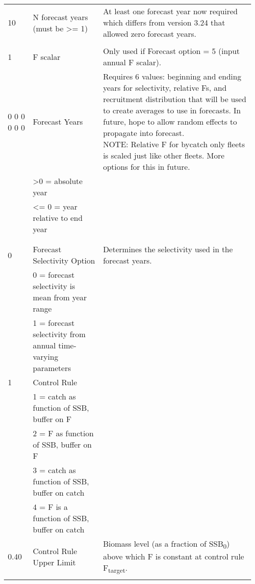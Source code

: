\begin{landscape}
{\begin{longtable}{p{3.2cm} p{7cm} p{10.8cm}}
  \hline
  10 & N forecast years (must be >= 1) &  \multirow{1}{1cm}[-0.25cm]{\parbox{11cm }{ At least one forecast year now required which differs from version 3.24 that allowed zero forecast years.}} \Tstrut\\
     & & \Bstrut\\
     
  \hline
  1 & F scalar & \multirow{1}{1cm}[-0.10cm]{\parbox{11cm}{Only used if Forecast option = 5 (input annual F scalar).}}\Tstrut\Bstrut\\
  
  \hline
  0 0 0 0 0 0 & Forecast Years &  \multirow{1}{1cm}[-0.25cm]{\parbox{11cm}{Requires 6 values:  beginning and ending years for selectivity, relative Fs, and recruitment distribution that will be used to create averages to use in forecasts.  In future, hope to allow random effects to propagate into forecast.  \\NOTE:  Relative F for bycatch only fleets is scaled just like other fleets.  More options for this in future.}}\Tstrut\\
    & >0 = absolute year & \\
    & <= 0 = year relative to end year & \\
    & & \\ 
    & & \Bstrut\\  

 \pagebreak   
 0 & Forecast Selectivity Option & Determines the selectivity used in the forecast years. \Tstrut\\
   & 0 = forecast selectivity is mean from year range & \\
   & 1 = forecast selectivity from annual time-varying parameters & \Bstrut\\

 \hline   
 1 & Control Rule & \Tstrut\\
   & 1 = catch as function of SSB, buffer on F & \\
   & 2 = F as function of SSB, buffer on F & \\
   & 3 = catch as function of SSB, buffer on catch & \\
   & 4 = F is a function of SSB, buffer on catch & \Bstrut\\
 \hline
 
 0.40 & Control Rule Upper Limit & \multirow{1}{1cm}[-0.25cm]{\parbox{11cm}{Biomass level (as a fraction of SSB\textsubscript{0}) above which F is constant at control rule F\textsubscript{target}.}} \Tstrut\\
   &  & \Bstrut\\
 

\end{longtable}}
\end{landscape}
